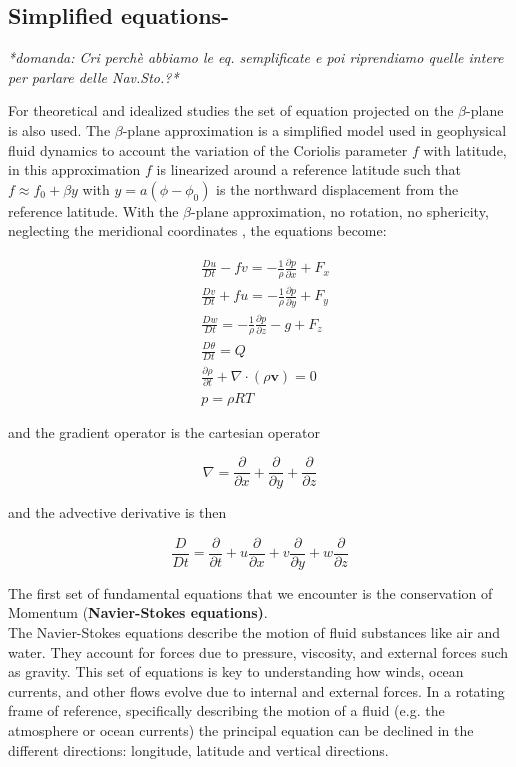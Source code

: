 \subsection{Simplified equations-}\label{summary-of-fundamental-equations}

\textit{*domanda: Cri perchè abbiamo le eq. semplificate e poi riprendiamo quelle intere per parlare delle Nav.Sto.?*}

For theoretical and idealized studies the set of equation projected on the \(\beta\)-plane is also used. The $\beta$-plane approximation is a simplified model used in geophysical fluid dynamics to account the variation of the Coriolis parameter $f$ with latitude, in this approximation $f$ is linearized around a reference latitude such that $f\approx f_0+\beta y$ with $y=a(\phi-\phi_0)$ is the northward displacement from the reference latitude. With the $\beta$-plane approximation, no rotation, no sphericity, neglecting the meridional coordinates , the equations become:

\[\begin{aligned}
		 & \frac{D u}{Dt} - fv  = -\frac{1}{\rho}\frac{\partial p}{\partial x}   + F_x \\
		 & \frac{D v}{Dt} + fu = -\frac{1}{\rho}\frac{\partial p}{\partial y}  + F_y   \\
		 & \frac{D w}{Dt}  = -\frac{1}{\rho }\frac{\partial p}{\partial z} -g  + F_z   \\
		 & \frac{D \theta}{Dt} = Q                                                     \\
		 & \frac{\partial \rho}{\partial t}+\nabla\cdot(\rho\mathbf{v}) = 0            \\
		 & p = \rho R T
	\end{aligned}\]

and the gradient operator is the cartesian operator

\[\nabla = \frac{\partial }{\partial x} + \frac{\partial }{\partial y} + \frac{\partial }{\partial z}\]

and the advective derivative is then

\[\frac{D }{Dt} = \frac{\partial }{\partial t} + u\frac{\partial }{\partial x} + v\frac{\partial }{\partial y} + w\frac{\partial }{\partial z}\]

The first set of fundamental equations that we encounter is the conservation of Momentum (\textbf{Navier-Stokes equations)}.\\
The Navier-Stokes equations describe the motion of fluid substances like air and water. They account for forces due to pressure, viscosity, and external forces such as gravity. This set of equations is key to understanding how winds, ocean currents, and other flows evolve due to internal and external forces. In a rotating frame of reference, specifically describing the motion of a fluid (e.g. the atmosphere or ocean currents) the principal equation can be declined in the different directions: longitude, latitude and vertical directions.


